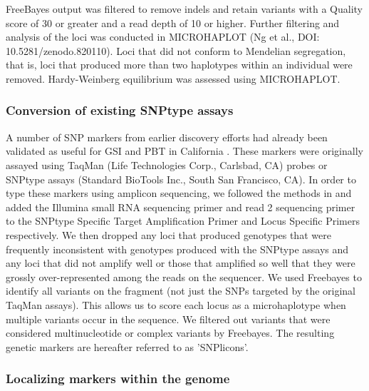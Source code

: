 FreeBayes output was filtered to remove indels and retain variants with a Quality score of 30 or greater and a read depth of 10 or higher. Further filtering and analysis of the loci was conducted in MICROHAPLOT (Ng et al., DOI: 10.5281/zenodo.820110). Loci that did not conform to Mendelian segregation, that is, loci that produced more than two haplotypes within an individual were removed. Hardy-Weinberg equilibrium was assessed using MICROHAPLOT. 


\subsubsection*{Conversion of existing SNPtype assays}

A number of SNP markers from earlier discovery efforts \citep{clemento2011discovery} had already 
been validated as useful for GSI
and PBT in California \citep{clemento2014evaluation}. These markers were originally assayed
using TaqMan (Life Technologies Corp., Carlsbad, CA) probes or SNPtype assays (Standard BioTools Inc., South San Francisco, CA).
In order to type these markers using amplicon sequencing, we followed the methods in
\citet{campbell2015genotyping} and added the Illumina small RNA sequencing primer and 
read 2 sequencing primer to the SNPtype Specific Target Amplification Primer and Locus 
Specific Primers respectively.  We then dropped any loci that produced genotypes that were 
frequently inconsistent with genotypes produced with the SNPtype assays and any loci that 
did not amplify well or those that amplified so well that they were grossly over-represented
among the reads on the sequencer.  We 
used Freebayes \citep{garrison2012haplotype} to identify all variants on the fragment (not just the SNPs targeted by the original TaqMan assays).  This allows us to score each locus as a
microhaplotype \citep{baetscher2018microhaplotypes} when multiple variants occur in the sequence.  We filtered out variants
that were considered multinucleotide or complex variants by Freebayes. The resulting genetic markers are hereafter referred to as 'SNPlicons'.


\subsubsection*{Localizing markers within the genome}

